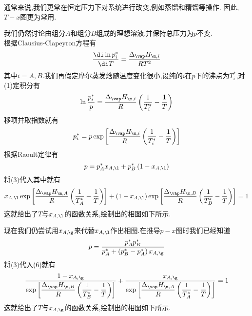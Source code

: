 \documentclass{ctexart}
\begin{document}
通常来说,我们更常在恒定压力下对系统进行改变,例如蒸馏和精馏等操作.%
因此,$T-x$图更为常用.
\begin{derivation}\setcounter{equation}{0}
    我们仍然讨论由组分$A$和组分$B$组成的理想溶液,并保持总压力为$p$不变.\\
    根据Clausius-Clapeyron方程有
    \begin{equation}
        \dfrac{\di\ln p_{i}^\ast}{\di T}=\dfrac{\Delta_\vap H_{\m,i}}{RT^2}
    \end{equation}
    其中$i=A,B$.我们再假定摩尔蒸发焓随温度变化很小,设纯的$i$在$p$下的沸点为$T_i^\ast$,对(1)定积分有
    \begin{equation}
        \ln\dfrac{p_i^\ast}{p}=\dfrac{\Delta_\vap H_{\m,i}}{R}\left(\dfrac{1}{T_i^\ast}-\dfrac1T\right)
    \end{equation}
    移项并取指数就有
    \begin{equation}
        p_i^\ast=p\exp{\left[\dfrac{\Delta_\vap H_{\m,i}}{R}\left(\dfrac{1}{T_i^\ast}-\dfrac1T\right)\right]}
    \end{equation}
    根据Raoult定律有
    \begin{equation}
        p=p_{A}^\ast x_{A,\l}+p_B^\ast\left(1-x_{A,\l}\right)
    \end{equation}
    将(3)代入其中就有
    \begin{equation}
        x_{A,\l}\exp{\left[\dfrac{\Delta_\vap H_{\m,A}}{R}\left(\dfrac{1}{T_A^\ast}-\dfrac1T\right)\right]}
        +\left(1-x_{A,\l}\right)\exp{\left[\dfrac{\Delta_\vap H_{\m,B}}{R}\left(\dfrac{1}{T_B^\ast}-\dfrac1T\right)\right]}=1
    \end{equation}
    这就给出了$T$与$x_{A,\l}$的函数关系,绘制出的相图如下所示.
    \begin{center}
        
    \end{center}
    现在我们仍尝试用$x_{A,\g}$来代替$x_{A,\l}$作出相图.在推导$p-x$图时我们已经知道
    \begin{equation}
        p=\dfrac{p_A^\ast p_B^\ast}{p_A^\ast+\left(p_B^\ast-p_A^\ast\right)x_{A,\g}}
    \end{equation}
    将(3)代入(6)就有
    \begin{equation}
        \dfrac{1-x_{A,\g}}{\exp{\left[\dfrac{\Delta_\vap H_{\m,B}}{R}\left(\dfrac{1}{T_B^\ast}-\dfrac1T\right)\right]}}+
        \dfrac{x_{A,\g}}{\exp{\left[\dfrac{\Delta_\vap H_{\m,A}}{R}\left(\dfrac{1}{T_A^\ast}-\dfrac1T\right)\right]}}=1
    \end{equation}
    这就给出了$T$与$x_{A,\g}$的函数关系,绘制出的相图如下所示.

\end{derivation}
\end{document}
